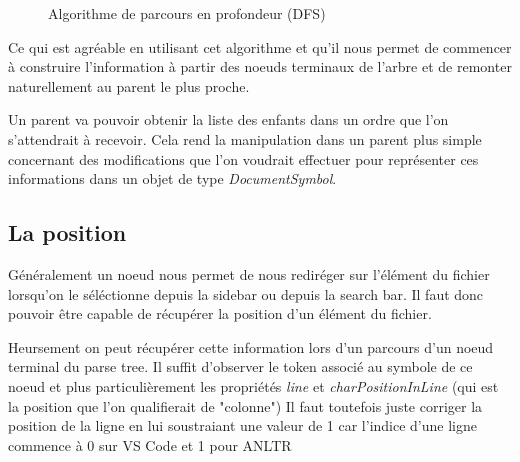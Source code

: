 \documentclass[
    iict, %
    il, %
]{heig-tb}
\begin{document}
\begin{figure}[!h]
    \begin{center}
    \end{center}
    \caption[Algorithme de parcours en profondeur (DFS)]{\label{Algorithme de parcours en profondeur (DFS)} Algorithme de parcours en profondeur (DFS)}
\end{figure}

Ce qui est agréable en utilisant cet algorithme et qu'il nous permet de commencer à construire l'information à partir des noeuds terminaux
de l'arbre et de remonter naturellement au parent le plus proche.

Un parent va pouvoir obtenir la liste des enfants dans un ordre que l'on s'attendrait à recevoir.
Cela rend la manipulation dans un parent plus simple concernant des modifications que l'on voudrait effectuer pour représenter ces informations
dans un objet de type \emph{DocumentSymbol}.

\subsection{La position}

Généralement un noeud nous permet de nous rediréger sur l'élément du fichier lorsqu'on le séléctionne depuis la sidebar ou depuis la search bar. %
Il faut donc pouvoir être capable de récupérer la position d'un élément du fichier.

Heursement on peut récupérer cette information lors d'un parcours d'un noeud terminal du parse tree.
Il suffit d'observer le token associé au symbole de ce noeud et plus particulièrement les
propriétés \emph{line} et \emph{charPositionInLine} (qui est la position que l'on qualifierait de "colonne")
Il faut toutefois juste corriger la position de la ligne en lui soustraiant une valeur de 1 car l'indice d'une ligne commence à 0 sur VS Code et 1 pour ANLTR %
\end{document}
